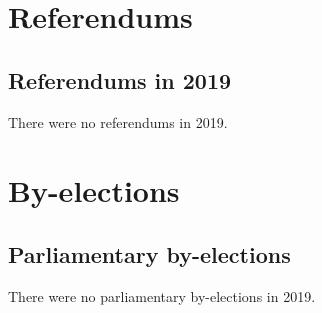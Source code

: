 \documentclass[a4paper,openany]{book}
\begin{document}
 
 



\part{Referendums}

\chapter{Referendums in 2019}

There were no referendums in 2019.

%
%

\part{By-elections}

\chapter{Parliamentary by-elections}

There were no parliamentary by-elections in 2019.
\end{document}
